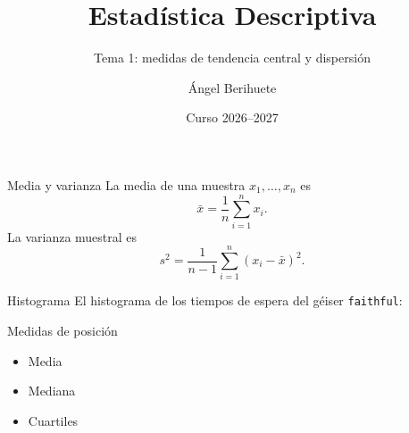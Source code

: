 \documentclass{beamer}
\title{Estadística Descriptiva}
\subtitle{Tema 1: medidas de tendencia central y dispersión}
\author{Ángel Berihuete}
\date{Curso 2026--2027}
\begin{document}
\begin{frame}
  \titlepage
\end{frame}

\begin{frame}{Media y varianza}
  La media de una muestra $x_1,\dots,x_n$ es
  \[
    \bar{x} = \frac{1}{n}\sum_{i=1}^{n} x_i .
  \]
  La varianza muestral es
  \[
    s^2 = \frac{1}{n-1}\sum_{i=1}^{n}(x_i-\bar{x})^2 .
  \]
\end{frame}

\begin{frame}{Histograma}
  El histograma de los tiempos de espera del géiser \texttt{faithful}:
\end{frame}

\begin{frame}{Medidas de posición}
  \begin{itemize}
    \item Media
    \item Mediana
    \item Cuartiles
  \end{itemize}
\end{frame}
\end{document}
